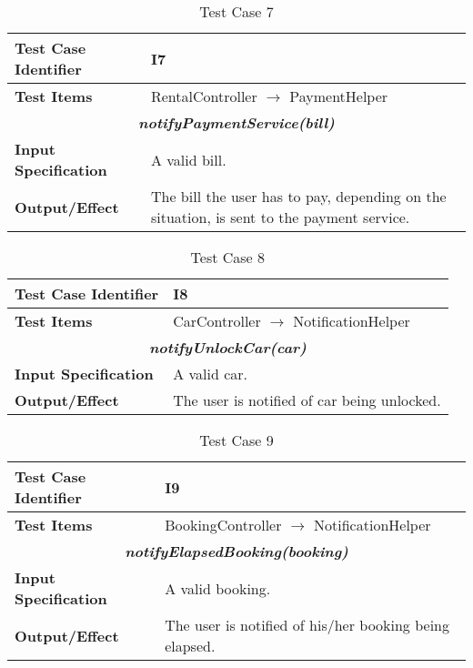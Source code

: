 \begin{table}[h]
	\begin{tabularx}{\textwidth}{l X}
		\hline
		\textbf{Test Case Identifier}	&	I7\\	\hline
		\textbf{Test Items}			&	RentalController $\rightarrow$ PaymentHelper \\	\hline\hline
		\multicolumn{2}{c}{\textbf{\textit{notifyPaymentService(bill)}}}	\\	\hline
			\textbf{Input Specification}	&	A valid bill.\\	\hline
			\textbf{Output/Effect}	&	The bill the user has to pay, depending on the situation, is sent to the payment service.\\	\hline\hline
	\end{tabularx}
	\captionsetup{textformat=empty,labelformat=blank}
	\caption{Test Case 7}
	\label{table:template-table-7}
\end{table}

\begin{table}[h]
	\begin{tabularx}{\textwidth}{l X}
		\hline
		\textbf{Test Case Identifier}	&	I8\\	\hline
		\textbf{Test Items}			&	CarController $\rightarrow$ NotificationHelper \\	\hline\hline
		\multicolumn{2}{c}{\textbf{\textit{notifyUnlockCar(car)}}}	\\	\hline
			\textbf{Input Specification}	&	A valid car.\\	\hline
			\textbf{Output/Effect}	&	The user is notified of car being unlocked.\\	\hline\hline
	\end{tabularx}
	\captionsetup{textformat=empty,labelformat=blank}
	\caption{Test Case 8}
	\label{table:template-table-8}
\end{table}

\begin{table}[h]
	\begin{tabularx}{\textwidth}{l X}
		\hline
		\textbf{Test Case Identifier}	&	I9\\	\hline
		\textbf{Test Items}			&	BookingController $\rightarrow$ NotificationHelper \\	\hline\hline
		\multicolumn{2}{c}{\textbf{\textit{notifyElapsedBooking(booking)}}}	\\	\hline
			\textbf{Input Specification}	&	A valid booking.\\	\hline
			\textbf{Output/Effect}	&	The user is notified of his/her booking being elapsed.\\	\hline\hline
	\end{tabularx}
	\captionsetup{textformat=empty,labelformat=blank}
	\caption{Test Case 9}
	\label{table:template-table-9}
\end{table}

